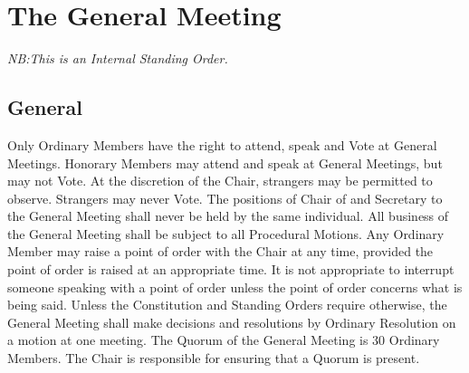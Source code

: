 \chapter{The General Meeting}
\textit{NB:This is an Internal Standing Order.}
\section{General}
\npara Only Ordinary Members have the right to attend, speak and Vote at General Meetings. Honorary Members may attend and speak at General Meetings, but may not Vote.  At the discretion of the Chair, strangers may be permitted to observe. Strangers may never Vote.
\npara The positions of Chair of and Secretary to the General Meeting shall never be held by the same individual.
\npara All business of the General Meeting shall be subject to all Procedural Motions.
\npara Any Ordinary Member may raise a point of order with the Chair at any time, provided the point of order is raised at an appropriate time.  It is not appropriate to interrupt someone speaking with a point of order unless the point of order concerns what is being said.
\npara Unless the Constitution and Standing Orders require otherwise, the General Meeting shall make decisions and resolutions by Ordinary Resolution on a motion at one meeting.
\npara The Quorum of the General Meeting is 30 Ordinary Members. The Chair is responsible for ensuring that a Quorum is present.
